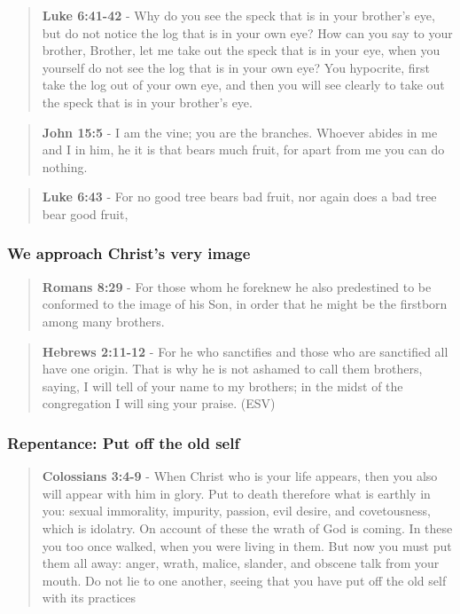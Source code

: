 \documentclass[11pt]{article}
\begin{document}
\begin{quote}
\textbf{Luke 6:41-42} - Why do you see the speck that is in your brother's eye, but do not notice the log that is in your own eye? How can you say to your brother, Brother, let me take out the speck that is in your eye, when you yourself do not see the log that is in your own eye? You hypocrite, first take the log out of your own eye, and then you will see clearly to take out the speck that is in your brother's eye.
\end{quote}

\begin{quote}
\textbf{John 15:5} - I am the vine; you are the branches. Whoever abides in me and I in him, he it is that bears much fruit, for apart from me you can do nothing.
\end{quote}

\begin{quote}
\textbf{Luke 6:43} - For no good tree bears bad fruit, nor again does a bad tree bear good fruit,
\end{quote}

\subsubsection{We approach Christ's very image}
\label{sec:org3d3101a}
\begin{quote}
\textbf{Romans 8:29} - For those whom he foreknew he also predestined to be conformed to the image of his Son, in order that he might be the firstborn among many brothers.
\end{quote}

\begin{quote}
\textbf{Hebrews 2:11-12} -  For he who sanctifies and those who are sanctified all have one origin.  That is why he is not ashamed to call them brothers, saying, I will tell of your name to my brothers; in the midst of the congregation I will sing your praise.  (ESV)
\end{quote}

\subsubsection{Repentance: Put off the old self}
\label{sec:orgd7b9d9c}
\begin{quote}
\textbf{Colossians 3:4-9} - When Christ who is your life appears, then you also will appear with him in glory. Put to death therefore what is earthly in you: sexual immorality, impurity, passion, evil desire, and covetousness, which is idolatry. On account of these the wrath of God is coming. In these you too once walked, when you were living in them. But now you must put them all away: anger, wrath, malice, slander, and obscene talk from your mouth. Do not lie to one another, seeing that you have put off the old self with its practices
\end{quote}
\end{document}
